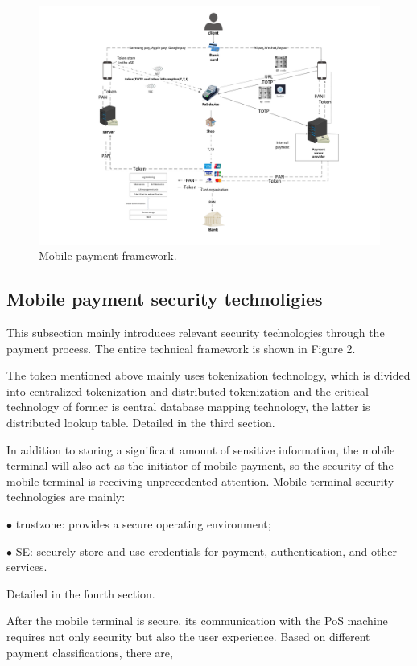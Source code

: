 \documentclass[journal]{IEEEtran}
\begin{document}
\begin{figure}[htbp]
\centerline{\includegraphics[scale=0.48]{datu.pdf}}
\caption{Mobile payment framework.}
\label{fig}
\end{figure}


\subsection{Mobile payment security technoligies}
This subsection mainly introduces relevant security technologies through the payment process. The entire technical framework is shown in Figure 2.

The token mentioned above mainly uses tokenization technology, which is divided into centralized tokenization and distributed tokenization and the critical technology of former is central database mapping technology, the latter is distributed lookup table. Detailed in the third section.

In addition to storing a significant amount of sensitive information, the mobile terminal will also act as the initiator of mobile payment, so the security of the mobile terminal is receiving unprecedented attention. Mobile terminal security technologies are mainly:
 
$\bullet$ trustzone: provides a secure operating environment;

$\bullet$ SE: securely store and use credentials for payment, authentication, and other services.

Detailed in the fourth section.


After the mobile terminal is secure, its communication with the PoS machine requires not only security but also the user experience. Based on different payment classifications, there are,
\end{document}
